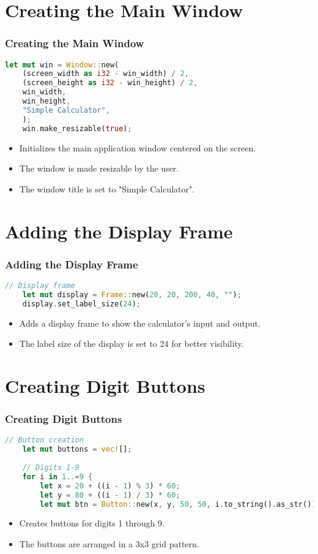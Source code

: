\documentclass[aspectratio=169, table]{beamer}
\begin{document}
\section{Creating the Main Window}
\begin{frame}[fragile]
\frametitle{Creating the Main Window}
\begin{lstlisting}[language=Rust]
	let mut win = Window::new(
	(screen_width as i32 - win_width) / 2,
	(screen_height as i32 - win_height) / 2,
	win_width,
	win_height,
	"Simple Calculator",
	);
	win.make_resizable(true);
\end{lstlisting}
\begin{itemize}
	\item Initializes the main application window centered on the screen.
	\item The window is made resizable by the user.
	\item The window title is set to "Simple Calculator".
\end{itemize}
\end{frame}

\section{Adding the Display Frame}
\begin{frame}[fragile]
\frametitle{Adding the Display Frame}
\begin{lstlisting}[language=Rust]
	// Display frame
	let mut display = Frame::new(20, 20, 200, 40, "");
	display.set_label_size(24);
\end{lstlisting}
\begin{itemize}
	\item Adds a display frame to show the calculator's input and output.
	\item The label size of the display is set to 24 for better visibility.
\end{itemize}
\end{frame}

\section{Creating Digit Buttons}
\begin{frame}[fragile]
\frametitle{Creating Digit Buttons}
\begin{lstlisting}[language=Rust]
	// Button creation
	let mut buttons = vec![];
	
	// Digits 1-9
	for i in 1..=9 {
		let x = 20 + ((i - 1) % 3) * 60;
		let y = 80 + ((i - 1) / 3) * 60;
		let mut btn = Button::new(x, y, 50, 50, i.to_string().as_str());
	\end{lstlisting}
	\begin{itemize}
		\item Creates buttons for digits 1 through 9.
		\item The buttons are arranged in a 3x3 grid pattern.
	\end{itemize}
\end{frame}
\end{document}
